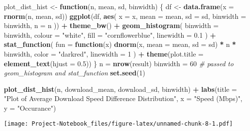 \documentclass[
]{article}
\newenvironment{Shaded}{\begin{snugshade}}{\end{snugshade}}
\newcommand{\AttributeTok}[1]{\textcolor[rgb]{0.13,0.29,0.53}{#1}}
\newcommand{\CommentTok}[1]{\textcolor[rgb]{0.56,0.35,0.01}{\textit{#1}}}
\newcommand{\ControlFlowTok}[1]{\textcolor[rgb]{0.13,0.29,0.53}{\textbf{#1}}}
\newcommand{\DecValTok}[1]{\textcolor[rgb]{0.00,0.00,0.81}{#1}}
\newcommand{\FloatTok}[1]{\textcolor[rgb]{0.00,0.00,0.81}{#1}}
\newcommand{\FunctionTok}[1]{\textcolor[rgb]{0.13,0.29,0.53}{\textbf{#1}}}
\newcommand{\NormalTok}[1]{#1}
\newcommand{\OtherTok}[1]{\textcolor[rgb]{0.56,0.35,0.01}{#1}}
\newcommand{\SpecialCharTok}[1]{\textcolor[rgb]{0.81,0.36,0.00}{\textbf{#1}}}
\newcommand{\StringTok}[1]{\textcolor[rgb]{0.31,0.60,0.02}{#1}}
\begin{document}
\begin{Shaded}
\begin{Highlighting}[]
\NormalTok{plot\_dist\_hist }\OtherTok{\textless{}{-}} \ControlFlowTok{function}\NormalTok{(n, mean, sd, binwidth) \{}
\NormalTok{  df }\OtherTok{\textless{}{-}} \FunctionTok{data.frame}\NormalTok{(}\AttributeTok{x =} \FunctionTok{rnorm}\NormalTok{(n, mean, sd))}
  \FunctionTok{ggplot}\NormalTok{(df, }\FunctionTok{aes}\NormalTok{(}
    \AttributeTok{x =}\NormalTok{ x,}
    \AttributeTok{mean =}\NormalTok{ mean,}
    \AttributeTok{sd =}\NormalTok{ sd,}
    \AttributeTok{binwidth =}\NormalTok{ binwidth,}
    \AttributeTok{n =}\NormalTok{ n}
\NormalTok{  )) }\SpecialCharTok{+}
    \FunctionTok{theme\_bw}\NormalTok{() }\SpecialCharTok{+}
    \FunctionTok{geom\_histogram}\NormalTok{(}
      \AttributeTok{binwidth =}\NormalTok{ binwidth,}
      \AttributeTok{colour =} \StringTok{"white"}\NormalTok{,}
      \AttributeTok{fill =} \StringTok{"cornflowerblue"}\NormalTok{,}
      \AttributeTok{linewidth =} \FloatTok{0.1}
\NormalTok{    ) }\SpecialCharTok{+}
    \FunctionTok{stat\_function}\NormalTok{(}
      \AttributeTok{fun =} \ControlFlowTok{function}\NormalTok{(x)}
        \FunctionTok{dnorm}\NormalTok{(x, }\AttributeTok{mean =}\NormalTok{ mean, }\AttributeTok{sd =}\NormalTok{ sd) }\SpecialCharTok{*}\NormalTok{ n }\SpecialCharTok{*}\NormalTok{ binwidth,}
      \AttributeTok{color =} \StringTok{"darkred"}\NormalTok{,}
      \AttributeTok{linewidth =} \DecValTok{1}
\NormalTok{    ) }\SpecialCharTok{+} 
    \FunctionTok{theme}\NormalTok{(}\AttributeTok{plot.title =} \FunctionTok{element\_text}\NormalTok{(}\AttributeTok{hjust =} \FloatTok{0.5}\NormalTok{)) }
\NormalTok{\}}
\NormalTok{n }\OtherTok{=} \FunctionTok{nrow}\NormalTok{(result)}
\NormalTok{binwidth }\OtherTok{=} \DecValTok{60} \CommentTok{\# passed to geom\_histogram and stat\_function}
\FunctionTok{set.seed}\NormalTok{(}\DecValTok{1}\NormalTok{)}

\FunctionTok{plot\_dist\_hist}\NormalTok{(n, download\_mean, download\_sd, binwidth) }\SpecialCharTok{+} \FunctionTok{labs}\NormalTok{(}\AttributeTok{title =} \StringTok{"Plot of Average   Download Speed Difference Distribution"}\NormalTok{, }\AttributeTok{x =} \StringTok{"Speed (Mbps)"}\NormalTok{, }\AttributeTok{y =} \StringTok{"Occurance"}\NormalTok{)}
\end{Highlighting}
\end{Shaded}

\texttt{[image: Project-Notebook\_files/figure-latex/unnamed-chunk-8-1.pdf]}
\end{document}
